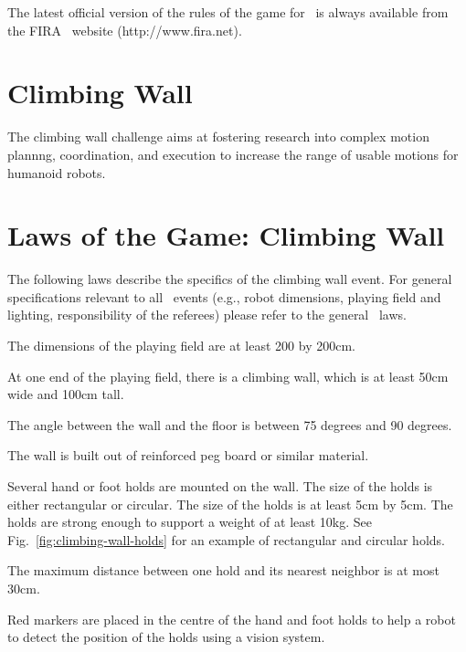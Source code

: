 \documentclass[12pt]{hurocup}
\begin{document}
The latest official version of the rules of the game for \HuroCup\ is
always available from the FIRA \HuroCup\ website (http://www.fira.net).

\newpage

\section{Climbing Wall}
\label{sec:climbing-wall}

The climbing wall challenge aims at fostering research into complex
motion plannng, coordination, and execution to increase the range of
usable motions for humanoid robots.

\section{Laws of the Game: Climbing Wall}
\label{sec:laws-climbing-wall}

The following laws describe the specifics of the climbing wall
event. For general specifications relevant to all \HuroCup\ events
(e.g., robot dimensions, playing field and lighting, responsibility of
the referees) please refer to the general \HuroCup\ laws.

\label{law:field-of-play}

\begin{lawlist}[CW]

\item The dimensions of the playing field are at least 200 by
  200cm. 

\item At one end of the playing field, there is a climbing wall, which
  is at least 50cm wide and 100cm tall. 

\item The angle between the wall and the floor is between 75 degrees
  and 90 degrees.
  
\item The wall is built out of reinforced peg board or similar
  material. 

\item Several hand or foot holds are mounted on the wall. The size of
  the holds is either rectangular or circular. The size of the holds
  is at least 5cm by 5cm. The holds are strong enough to support a
  weight of at least 10kg. See Fig.~\ref{fig:climbing-wall-holds} for
  an example of rectangular and circular holds.

\item The maximum distance between one hold and its nearest neighbor
  is at most 30cm.

\item Red markers are placed in the centre of the hand and foot holds
  to help a robot to detect the position of the holds using a vision
  system.

\end{lawlist}
\end{document}
